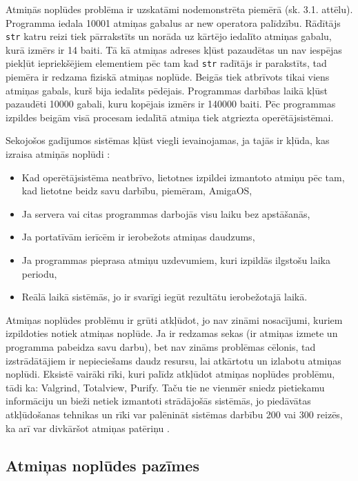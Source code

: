 Atmiņās noplūdes problēma ir uzskatāmi nodemonstrēta piemērā (sk. 3.1. attēlu).
Programma  iedala 10001 atmiņas gabalus ar new operatora palīdzību. 
Rādītājs \texttt{str} katru reizi tiek pārrakstīts un norāda uz kārtējo iedalīto atmiņas gabalu, kurā izmērs ir 14 baiti.
Tā kā atmiņas adreses kļūst pazaudētas un nav iespējas piekļūt iepriekšējiem elementiem pēc tam kad  \texttt{str} radītājs ir parakstīts, tad piemēra ir redzama fiziskā atmiņas noplūde.
Beigās tiek atbrīvots tikai viens atmiņas gabals, kurš bija iedalīts pēdējais. 
Programmas darbības laikā kļūst pazaudēti 10000 gabali, kuru kopējais izmērs ir 140000 baiti.
 Pēc programmas izpildes beigām visā procesam iedalītā atmiņa tiek atgriezta operētājsistēmai.


Sekojošos gadījumos sistēmas kļūst viegli ievainojamas, ja tajās ir kļūda, kas izraisa atmiņās noplūdi \cite{RTTV}: 
\begin{itemize}
\item { Kad operētājsistēma neatbrīvo, lietotnes izpildei izmantoto atmiņu pēc tam, kad lietotne beidz savu darbību, piemēram, AmigaOS,}
\item { Ja servera vai citas programmas darbojās visu laiku bez apstāšanās, }
\item { Ja portatīvām ierīcēm ir ierobežots atmiņas daudzums, }
\item { Ja programmas pieprasa atmiņu uzdevumiem, kuri izpildās ilgstošu laika periodu, }
\item { Reālā laikā sistēmās, jo ir svarīgi iegūt rezultātu ierobežotajā laikā. }
\end{itemize}

Atmiņas noplūdes problēmu ir grūti atkļūdot,  jo nav zināmi nosacījumi, kuriem izpildoties notiek atmiņas noplūde. 
Ja ir redzamas sekas (ir atmiņas izmete un programma pabeidza savu darbu), bet nav zināms problēmas cēlonis, tad izstrādātājiem ir nepieciešams daudz resursu, lai atkārtotu un izlabotu atmiņas noplūdi. 
Eksistē vairāki rīki, kuri palīdz atkļūdot atmiņas noplūdes problēmu, tādi ka: Valgrind, Totalview, Purify. 
Taču tie ne vienmēr sniedz pietiekamu informāciju un bieži netiek izmantoti strādājošās sistēmās, jo piedāvātas atkļūdošanas tehnikas un rīki var palēnināt sistēmas darbību 200 vai 300 reizēs, ka arī var divkāršot atmiņas patēriņu \cite{atparv}. 



\subsection{Atmiņas noplūdes pazīmes}


